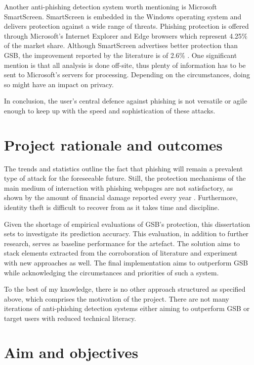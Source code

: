 Another anti-phishing detection system worth mentioning is Microsoft SmartScreen. SmartScreen is embedded in the Windows operating system and delivers protection against a wide range of threats. Phishing protection is offered through Microsoft's Internet Explorer and Edge browsers which represent 4.25\% of the market share. Although SmartScreen advertises better protection than GSB, the improvement reported by the literature is of 2.6\% \citep{Adebowale}. One significant mention is that all analysis is done off-site, thus plenty of information has to be sent to Microsoft's servers for processing. Depending on the circumstances, doing so might have an impact on privacy.

In conclusion, the user's central defence against phishing is not versatile or agile enough to keep up with the speed and sophistication of these attacks.


\section{Project rationale and outcomes}
\label{sec:project_rationale_and_outcomes}
The trends and statistics outline the fact that phishing will remain a prevalent type of attack for the foreseeable future. Still, the protection mechanisms of the main medium of interaction with phishing webpages are not satisfactory, as shown by the amount of financial damage reported every year \citep{APWG_Q42019}. Furthermore, identity theft is difficult to recover from as it takes time and discipline.

Given the shortage of empirical evaluations of GSB's protection, this dissertation sets to investigate its prediction accuracy. This evaluation, in addition to further research, serves as baseline performance for the artefact. The solution aims to stack elements extracted from the corroboration of literature and experiment with new approaches as well. The final implementation aims to outperform GSB while acknowledging the circumstances and priorities of such a system.

To the best of my knowledge, there is no other approach structured as specified above, which comprises the motivation of the project. There are not many iterations of anti-phishing detection systems either aiming to outperform GSB or target users with reduced technical literacy.


\section{Aim and objectives}
